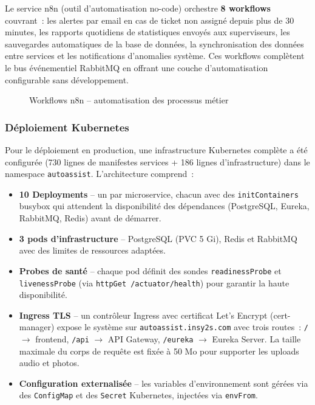 Le service n8n (outil d'automatisation no-code) orchestre \textbf{8 workflows} couvrant~: les alertes par email en cas de ticket non assign\'{e} depuis plus de 30 minutes, les rapports quotidiens de statistiques envoy\'{e}s aux superviseurs, les sauvegardes automatiques de la base de donn\'{e}es, la synchronisation des donn\'{e}es entre services et les notifications d'anomalies syst\`{e}me. Ces workflows compl\`{e}tent le bus \'{e}v\'{e}nementiel RabbitMQ en offrant une couche d'automatisation configurable sans d\'{e}veloppement.

\begin{figure}[H]
    \centering
    \caption{Workflows n8n -- automatisation des processus m\'{e}tier}
    \label{fig:n8n}
\end{figure}

\subsubsection{D\'{e}ploiement Kubernetes}

Pour le d\'{e}ploiement en production, une infrastructure Kubernetes compl\`{e}te a \'{e}t\'{e} configur\'{e}e (730 lignes de manifestes services + 186 lignes d'infrastructure) dans le namespace \texttt{autoassist}. L'architecture comprend~:

\begin{itemize}
    \item \textbf{10 Deployments} -- un par microservice, chacun avec des \texttt{initContainers} busybox qui attendent la disponibilit\'{e} des d\'{e}pendances (PostgreSQL, Eureka, RabbitMQ, Redis) avant de d\'{e}marrer.
    \item \textbf{3 pods d'infrastructure} -- PostgreSQL (PVC 5 Gi), Redis et RabbitMQ avec des limites de ressources adapt\'{e}es.
    \item \textbf{Probes de sant\'{e}} -- chaque pod d\'{e}finit des sondes \texttt{readinessProbe} et \texttt{livenessProbe} (via \texttt{httpGet /actuator/health}) pour garantir la haute disponibilit\'{e}.
    \item \textbf{Ingress TLS} -- un contr\^{o}leur Ingress avec certificat Let's Encrypt (cert-manager) expose le syst\`{e}me sur \texttt{autoassist.insy2s.com} avec trois routes~: \texttt{/} $\rightarrow$ frontend, \texttt{/api} $\rightarrow$ API Gateway, \texttt{/eureka} $\rightarrow$ Eureka Server. La taille maximale du corps de requ\^{e}te est fix\'{e}e \`{a} 50 Mo pour supporter les uploads audio et photos.
    \item \textbf{Configuration externalis\'{e}e} -- les variables d'environnement sont g\'{e}r\'{e}es via des \texttt{ConfigMap} et des \texttt{Secret} Kubernetes, inject\'{e}es via \texttt{envFrom}.
\end{itemize}

